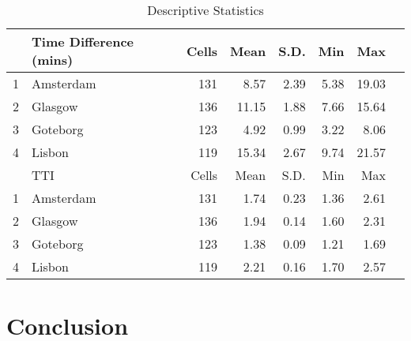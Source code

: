 \documentclass[a4paper]{jpconf}
\begin{document}
\begin{table}[ht]	
	\caption {Descriptive Statistics}
	\label{Results}
	\centering
	\begin{tabular}{rlrrrrrr}
		\hline
		& Time Difference (mins) & Cells & Mean & S.D. & Min & Max \\ 
		\hline
		1 & Amsterdam 	& 131 & 8.57  & 2.39 & 5.38 & 19.03 \\ 
		2 & Glasgow 	& 136 & 11.15 & 1.88 & 7.66 & 15.64 \\ 
		3 & Goteborg 	& 123 & 4.92  & 0.99 & 3.22 & 8.06  \\ 
		4 & Lisbon 		& 119 & 15.34 & 2.67 & 9.74 & 21.57 \\ 
		
		\hline
		& TTI & Cells & Mean & S.D. & Min & Max \\ 
		\hline
		1 & Amsterdam 	& 131 & 1.74 & 0.23 & 1.36 & 2.61 \\ 
		2 & Glasgow 	& 136 & 1.94 & 0.14 & 1.60 & 2.31 \\ 
		3 & Goteborg	& 123 & 1.38 & 0.09 & 1.21 & 1.69 \\ 
		4 & Lisbon 		& 119 & 2.21 & 0.16 & 1.70 & 2.57 \\ 
		\hline
	\end{tabular}
\end{table}





\section{Conclusion}
\end{document}
